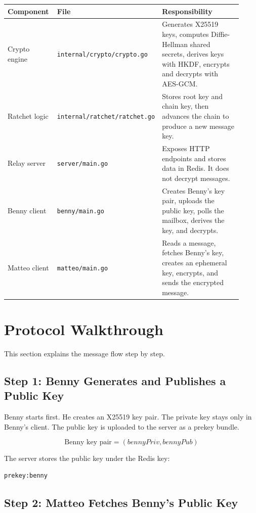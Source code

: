 \documentclass[12pt,a4paper]{article}
\begin{document}
\begin{longtable}{p{0.22\linewidth} p{0.18\linewidth} p{0.52\linewidth}}
\toprule
\textbf{Component} & \textbf{File} & \textbf{Responsibility} \\
\midrule
Crypto engine & \texttt{internal/crypto/crypto.go} & Generates X25519 keys, computes Diffie-Hellman shared secrets, derives keys with HKDF, encrypts and decrypts with AES-GCM. \\
Ratchet logic & \texttt{internal/ratchet/ratchet.go} & Stores root key and chain key, then advances the chain to produce a new message key. \\
Relay server & \texttt{server/main.go} & Exposes HTTP endpoints and stores data in Redis. It does not decrypt messages. \\
Benny client & \texttt{benny/main.go} & Creates Benny's key pair, uploads the public key, polls the mailbox, derives the key, and decrypts. \\
Matteo client & \texttt{matteo/main.go} & Reads a message, fetches Benny's key, creates an ephemeral key, encrypts, and sends the encrypted message. \\
\bottomrule
\end{longtable}

\section{Protocol Walkthrough}

This section explains the message flow step by step.

\subsection{Step 1: Benny Generates and Publishes a Public Key}

Benny starts first. He creates an X25519 key pair. The private key stays only in Benny's client. The public key is uploaded to the server as a prekey bundle.

\[
\text{Benny key pair} = (bennyPriv, bennyPub)
\]

The server stores the public key under the Redis key:

\begin{lstlisting}[style=output]
prekey:benny
\end{lstlisting}

\subsection{Step 2: Matteo Fetches Benny's Public Key}
\end{document}
